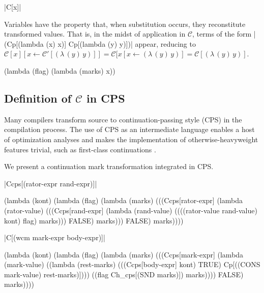 \documentclass[ms,electronic,twosidetoc,letterpaper,chaptercenter,parttop]{byumsphd}
\newcommand{\C}[1]{\mathcal{C}[#1]}
\newcommand{\Cp}[1]{\mathcal{C}'[#1]}
\newcommand{\abs}[2]{(\lambda\,(#1)\,#2)}
\begin{document}
\begin{schemedefn}{\scheme|C[x]|}

Variables have the property that, when substitution occurs, they reconstitute transformed values. That is, in the midst of application in $\mathcal{C}$, terms of the form \scheme|(Cp[(lambda (x) x)] Cp[(lambda (y) y)])| appear, reducing to $\C{x}[x\leftarrow \Cp{\abs{y}{y}}]=\C{x[x\leftarrow\abs{y}{y}}=\C{\abs{y}{y}}$.
\begin{schemedisplay}
(lambda (flag)
  (lambda (marks)
    x))
\end{schemedisplay}
\end{schemedefn}

\subsection{Definition of $\mathcal{C}$ in CPS}

Many compilers transform source to continuation-passing style (CPS) in the compilation process. The use of CPS as an intermediate language enables a host of optimization analyses and makes the implementation of otherwise-heavyweight features trivial, such as first-class continuations \cite{appel2007compiling}.

We present a continuation mark transformation integrated in CPS.

\begin{schemedefn}{\scheme|Ccps[(rator-expr rand-expr)]|}
\begin{schemedisplay}
(lambda (kont)
   (lambda (flag)
     (lambda (marks)
       (((Ccps[rator-expr]
          (lambda (rator-value)
            (((Ccps[rand-expr]
               (lambda (rand-value)
                 ((((rator-value rand-value) kont) flag) marks)))
              FALSE)
             marks)))
         FALSE)
        marks))))
\end{schemedisplay}
\end{schemedefn}

\begin{schemedefn}{\scheme|C[(wcm mark-expr body-expr)]|}
\begin{schemedisplay}
(lambda (kont)
  (lambda (flag)
    (lambda (marks)
      (((Ccps[mark-expr]
          (lambda (mark-value) 
            ((lambda (rest-marks) 
               (((Ccps[body-expr] kont) TRUE) Cp[((CONS mark-value) rest-marks)])))
             ((flag Ch_cps[(SND marks)]) marks))))
        FALSE)
       marks))))
\end{schemedisplay}
\end{schemedefn}
\end{document}
